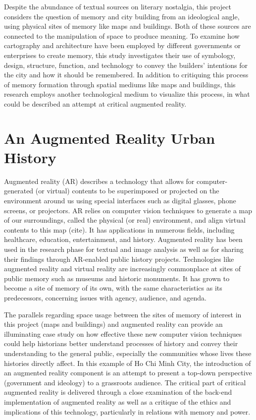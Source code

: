 Despite the abundance of textual sources on literary nostalgia, this project considers the question of memory and city building from an ideological angle, using physical sites of memory like maps and buildings. Both of these sources are connected to the manipulation of space to produce meaning. To examine how cartography and architecture have been employed by different governments or enterprises to create memory, this study investigates their use of symbology, design, structure, function, and technology to convey the builders’ intentions for the city and how it should be remembered. In addition to critiquing this process of memory formation through spatial mediums like maps and buildings, this research employs another technological medium to visualize this process, in what could be described an attempt at critical augmented reality.

\section{An Augmented Reality Urban History}
Augmented reality (AR) describes a technology that allows for computer-generated (or virtual) contents to be superimposed or projected on the environment around us using special interfaces such as digital glasses, phone screens, or projectors. AR relies on computer vision techniques to generate a map of our surroundings, called the physical (or real) environment, and align virtual contents to this map (cite). It has applications in numerous fields, including healthcare, education, entertainment, and history. Augmented reality has been used in the research phase for textual and image analysis as well as for sharing their findings through AR-enabled public history projects.  Technologies like augmented reality and virtual reality are increasingly commonplace at sites of public memory such as museums and historic monuments. It has grown to become a site of memory of its own, with the same characteristics as its predecessors, concerning issues with agency, audience, and agenda.

The parallels regarding space usage between the sites of memory of interest in this project (maps and buildings) and augmented reality can provide an illuminating case study on how effective these new computer vision techniques could help historians better understand processes of history and convey their understanding to the general public, especially the communities whose lives these histories directly affect. In this example of Ho Chi Minh City, the introduction of an augmented reality component is an attempt to present a top-down perspective (government and ideology) to a grassroots audience. The critical part of critical augmented reality is delivered through a close examination of the back-end implementation of augmented reality as well as a critique of the ethics and implications of this technology, particularly in relations with memory and power.

